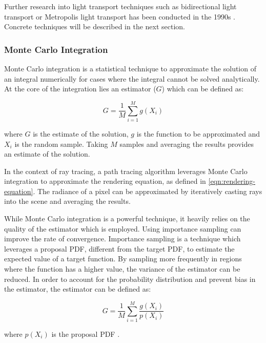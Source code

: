 Further research into light transport techniques such as bidirectional light transport or Metropolis light transport has been conducted in the 1990s \cite{veachMonteCarloLightTransport}. Concrete techniques will be described in the next section.

\subsubsection{Monte Carlo Integration}
\label{sec:monte-carlo-integration-sampling}

Monte Carlo integration is a statistical technique to approximate the solution of an integral numerically for cases where the integral cannot be solved analytically. At the core of the integration lies an estimator ($G$) which can be defined as:

\begin{equation}
  G = \frac{1}{M}\sum_{i=1}^M g(X_i)
  \label{eq:monteCarlo}
\end{equation}

where $G$ is the estimate of the solution, $g$ is the function to be approximated and $X_i$ is the random sample. Taking $M$ samples and averaging the results provides an estimate of the solution. \cite{kalos2009monte}

In the context of ray tracing, a path tracing algorithm leverages Monte Carlo integration to approximate the rendering equation, as defined in \autoref{eqn:rendering-equation}. The radiance of a pixel can be approximated by iteratively casting rays into the scene and averaging the results. 

While Monte Carlo integration is a powerful technique, it heavily relies on the quality of the estimator which is employed. Using importance sampling can improve the rate of convergence. Importance sampling is a technique which leverages a proposal \gls{PDF}, different from the target \gls{PDF}, to estimate the expected value of a target function. By sampling more frequently in regions where the function has a higher value, the variance of the estimator can be reduced. In order to account for the probability distribution and prevent bias in the estimator, the estimator can be defined as:

\begin{equation}
  G = \frac{1}{M}\sum_{i=1}^M \frac{g(X_i)}{p(X_i)}
  \label{eq:importanceSampling}
\end{equation}

where $p(X_i)$ is the proposal \gls{PDF} \cite{Pharr_Physically_Based_Rendering_2023}.

